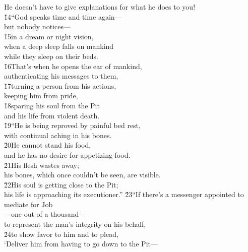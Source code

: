 \begin{poetry}
\poemll    He doesn't have to give explanations for what he does to you! \\
\poeml \v{14}``God speaks time and time again--- \\
\poemll    but nobody notices--- \\
\poeml \v{15}in a dream or night vision, \\
\poemll    when a deep sleep falls on mankind \\
\poemlll       while they sleep on their beds. \\
\poeml \v{16}That's when he opens the ear of mankind, \\
\poemll    authenticating his messages to them, \\
\poeml \v{17}turning a person from his actions, \\
\poemll    keeping him from pride, \\
\poeml \v{18}sparing his soul from the Pit \\
\poemll    and his life from violent death. \\
\poeml \v{19}``He is being reproved by painful bed rest, \\
\poemll    with continual aching in his bones. \\
\poeml \v{20}He cannot stand his food, \\
\poemll    and he has no desire for appetizing food. \\
\poeml \v{21}His flesh wastes away; \\
\poemll    his bones, which once couldn't be seen, are visible. \\
\poeml \v{22}His soul is getting close to the Pit; \\
\poemll    his life is approaching its executioner.''
\poeml \v{23}``If there's a messenger appointed to mediate for Job \\
\poemll    ---one out of a thousand--- \\
\poemlll       to represent the man's integrity on his behalf, \\
\poeml \v{24}to show favor to him and to plead, \\
\poemll    `Deliver him from having to go down to the Pit--- \\

\end{poetry}

